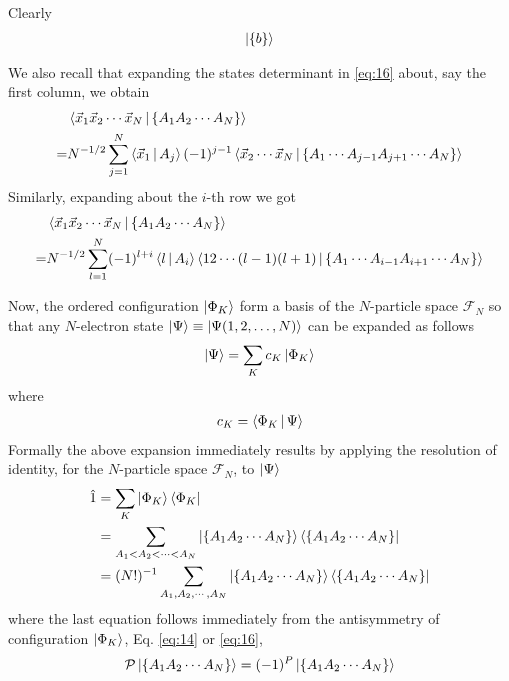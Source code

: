 \documentclass{book}
\renewcommand{\braket}[1]{\Braket{#1}}
\renewcommand{\ket}[1]{\Ket{#1}}
\renewcommand{\bra}[1]{\Bra{#1}}
\begin{document}
Clearly
\begin{align}
    \ket{\{b\}}
\end{align}

We also recall that expanding the states determinant in \eqref{eq:16} about, say the first column, we obtain 
\begin{align}
    &\braket{\vec{x}_1\vec{x}_2\cdots\vec{x}_N|\{A_1A_2\cdots A_N\}}\notag\\
    =&N^{-1/2}\sum_{j=1}^N\braket{\vec{x}_1|A_j}(-1)^{j-1}\braket{\vec{x}_2\cdots\vec{x}_N|\{A_1\cdots A_{j-1}A_{j+1}\cdots A_N\}}
\end{align} 
Similarly, expanding about the $i$-th row we got
\begin{align}
    &\braket{\vec{x}_1\vec{x}_2\cdots\vec{x}_N|\{A_1A_2\cdots A_N\}}\notag\\
    =&N^{-1/2}\sum_{l=1}^N (-1)^{l+i}\braket{l|A_i} \braket{12\cdots(l-1)(l+1)|\{A_1\cdots A_{i-1}A_{i+1}\cdots A_N\}}
\end{align}

Now, the ordered configuration $\ket{\Phi_K}$ form a basis of the $N$-particle space $\mathcal{F}_N$ so that any $N$-electron state $\ket{\Psi}\equiv \ket{\Psi(1,2,\ldots,N)}$ can be expanded as follows 
\begin{align}
    \ket{\Psi} = \sum_K c_K\ket{\Phi_K}
\end{align}
where 
\begin{align}
    c_K = \braket{\Phi_K|\Psi}
\end{align}
Formally the above expansion immediately results by applying the resolution of identity, for the $N$-particle space $\mathcal{F}_N$, to $\ket{\Psi}$ 
\begin{align}
    \hat{1} & = \sum_K \ket{\Phi_K}\bra{\Phi_K} \notag\\
            & = \sum_{A_1<A_2<\cdots<A_N}\ket{\{A_1A_2\cdots A_N\}}\bra{\{A_1A_2\cdots A_N\}} \notag\\
            & = (N!)^{-1} \sum_{A_1,A_2,\cdots,A_N}\ket{\{A_1A_2\cdots A_N\}}\bra{\{A_1A_2\cdots A_N\}}
\end{align}
where the last equation follows immediately from the antisymmetry of configuration $\ket{\Phi_K}$, Eq. \eqref{eq:14} or \eqref{eq:16},
\begin{align}
    \mathcal{P}\ket{\{A_1A_2\cdots A_N\}} = (-1)^P\ket{\{A_1A_2\cdots A_N\}}
\end{align}
\end{document}
